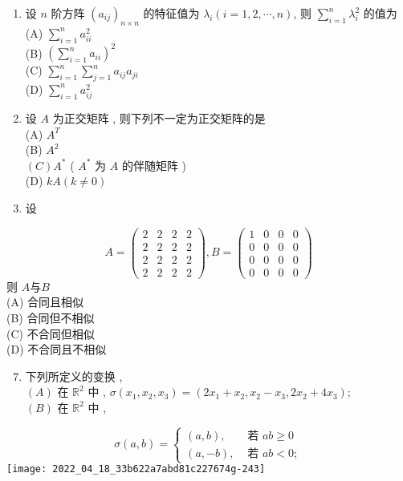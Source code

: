 \documentclass[10pt]{article}
\begin{document}
{\begin{enumerate}
  \item  设  $n$  阶方阵  $\left(a_{i j}\right)_{n \times n}$  的特征值为  $\lambda_{i}(i=1,2, \cdots, n)$,  则  $\sum_{i=1}^{n} \lambda_{i}^{2}$  的值为 \\
(A) $\sum_{i=1}^{n} a_{i i}^{2}$\\
(B) $\left(\sum_{i=1}^{n} a_{i i}\right)^{2}$\\
(C) $\sum_{i=1}^{n} \sum_{j=1}^{n} a_{i j} a_{j i}$\\
(D) $\sum_{i=1}^{n} a_{i j}^{2}$

  \item  设  $A$  为正交矩阵 ,  则下列不一定为正交矩阵的是 \\
(A) $A^{T}$\\
(B) $A^{2}$\\
$(C) A^{*}$ ( $A^{*}$  为  $A$  的伴随矩阵 )\\
(D) $k A(k \neq 0)$

  \item  设 

\end{enumerate}
$$
A=\left(\begin{array}{llll}
2 & 2 & 2 & 2 \\
2 & 2 & 2 & 2 \\
2 & 2 & 2 & 2 \\
2 & 2 & 2 & 2
\end{array}\right), B=\left(\begin{array}{llll}
1 & 0 & 0 & 0 \\
0 & 0 & 0 & 0 \\
0 & 0 & 0 & 0 \\
0 & 0 & 0 & 0
\end{array}\right)
$$
 则  $A 与 B$\\
(A)  合同且相似 \\
(B)  合同但不相似 \\
(C)  不合同但相似 \\
(D)  不合同且不相似 

\begin{enumerate}
  \setcounter{enumi}{6}
  \item  下列所定义的变换 ,\\
$(A)$  在  $\mathbb{R}^{2}$  中 , $\sigma\left(x_{1}, x_{2}, x_{3}\right)=\left(2 x_{1}+x_{2}, x_{2}-x_{3}, 2 x_{2}+4 x_{3}\right)$;\\
$(B)$  在  $\mathbb{R}^{2}$  中 ,
\end{enumerate}
$$
\sigma(a, b)= \begin{cases}(a, b), & \text { 若 } a b \geqslant 0 \\ (a,-b), & \text { 若 } a b<0 ;\end{cases}
$$
\texttt{[image: 2022\_04\_18\_33b622a7abd81c227674g-243]}

}
\end{document}
